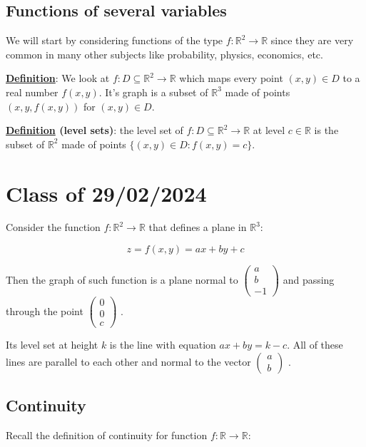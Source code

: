 \documentclass[10pt]{extarticle}
\newcommand{\R}{\mathbb{R}}
\begin{document}
\subsection{Functions of several variables}

We will start by considering functions of the type $f: \R^2 \to \R$ since they are very common in many other subjects like probability, physics, economics, etc.

\textbf{\underline{Definition}}: We look at $f: D \subseteq \R^2 \to \R$ which maps every point $(x, y) \in D$ to a real number $f(x, y)$.
It's graph is a subset of $\R^3$ made of points $(x, y, f(x, y))$ for $(x, y) \in D$.

\textbf{\underline{Definition} (level sets)}: the level set of $f: D \subseteq \R^2 \to \R$ at level $c \in \R$ is the subset of $\R^2$ made of points $\{ (x, y) \in D : f(x, y) = c \}$.

\section{Class of 29/02/2024}

Consider the function $f: \R^2 \to \R$ that defines a plane in $\R^3$:

$$
    z = f(x, y) = ax + by + c
$$

Then the graph of such function is a plane normal to
$\begin{pmatrix}
        a \\ b \\ -1
    \end{pmatrix}$
and passing through the point
$\begin{pmatrix}
        0 \\ 0 \\ c
    \end{pmatrix}$
.

Its level set at height $k$ is the line with equation $ax + by = k - c$. All of these lines are parallel to each other and normal to the vector
$\begin{pmatrix}
        a \\ b
    \end{pmatrix}$
.


\subsection{Continuity}

Recall the definition of continuity for function $f: \R \to \R$:
\end{document}
